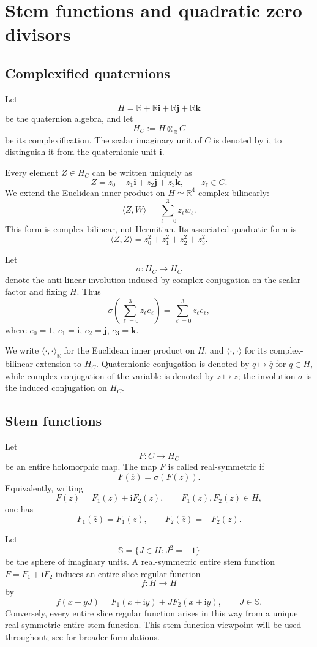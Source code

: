 \documentclass[11pt]{amsart}
\def\HH{H}%
\def\HHc{H_C}%
\def\CC{C}%
\numberwithin{equation}{section}
\theoremstyle{definition}
\theoremstyle{remark}
\newcommand{\HH}{\mathbb H}
\newcommand{\CC}{\mathbb C}
\newcommand{\RR}{\mathbb R}
\newcommand{\HHc}{\mathbb H_{\mathbb C}}
\newcommand{\Scal}{\mathbb S}
\begin{document}
\section{Stem functions and quadratic zero divisors}
\label{sec:stem}

\subsection{Complexified quaternions}

Let
\[
\HH=\RR+\RR\mathbf i+\RR\mathbf j+\RR\mathbf k
\]
be the quaternion algebra, and let
\[
\HHc:=\HH\otimes_{\RR}\CC
\]
be its complexification. The scalar imaginary unit of $\CC$ is denoted by $\mathrm i$, to distinguish it from the quaternionic unit $\mathbf i$.

Every element $Z\in\HHc$ can be written uniquely as
\[
Z=z_0+z_1\mathbf i+z_2\mathbf j+z_3\mathbf k,
\qquad z_\ell\in\CC.
\]
We extend the Euclidean inner product on $\HH\simeq\RR^4$ complex bilinearly:
\[
\langle Z,W\rangle=\sum_{\ell=0}^3z_\ell w_\ell.
\]
This form is complex bilinear, not Hermitian. Its associated quadratic form is
\[
\langle Z,Z\rangle=z_0^2+z_1^2+z_2^2+z_3^2.
\]

Let
\[
\sigma:\HHc\to\HHc
\]
denote the anti-linear involution induced by complex conjugation on the scalar factor and fixing $\HH$. Thus
\[
\sigma\left(\sum_{\ell=0}^3 z_\ell e_\ell\right)=\sum_{\ell=0}^3\overline{z_\ell}e_\ell,
\]
where $e_0=1$, $e_1=\mathbf i$, $e_2=\mathbf j$, $e_3=\mathbf k$.

We write $\langle\cdot,\cdot\rangle_{\RR}$ for the Euclidean inner product on $\HH$, and $\langle\cdot,\cdot\rangle$ for its complex-bilinear extension to $\HHc$.  Quaternionic conjugation is denoted by $q\mapsto\overline q$ for $q\in\HH$, while complex conjugation of the variable is denoted by $z\mapsto\overline z$; the involution $\sigma$ is the induced conjugation on $\HHc$.

\subsection{Stem functions}

Let
\[
F:\CC\to\HHc
\]
be an entire holomorphic map. The map $F$ is called real-symmetric if
\[
F(\overline z)=\sigma(F(z)).
\]
Equivalently, writing
\[
F(z)=F_1(z)+\mathrm i F_2(z),\qquad F_1(z),F_2(z)\in\HH,
\]
one has
\[
F_1(\overline z)=F_1(z),\qquad F_2(\overline z)=-F_2(z).
\]

Let
\[
\Scal=\{J\in\HH:J^2=-1\}
\]
be the sphere of imaginary units. A real-symmetric entire stem function $F=F_1+\mathrm iF_2$ induces an entire slice regular function
\[
f:\HH\to\HH
\]
by
\[
f(x+yJ)=F_1(x+\mathrm i y)+JF_2(x+\mathrm i y),\qquad J\in\Scal.
\]
Conversely, every entire slice regular function arises in this way from a unique real-symmetric entire stem function.  This stem-function viewpoint will be used throughout; see \cite{GhiloniPerotti2011Alternative,GentiliStoppatoStruppa2013Regular} for broader formulations.
\end{document}
